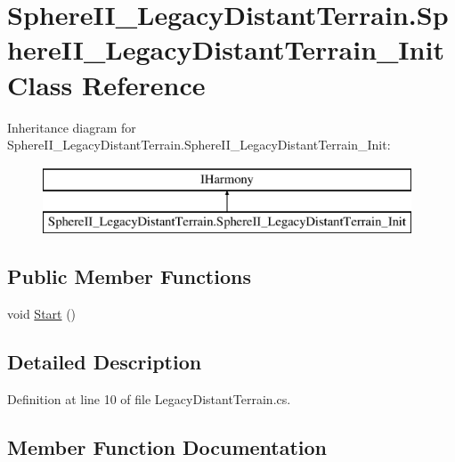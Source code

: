 \hypertarget{class_sphere_i_i___legacy_distant_terrain_1_1_sphere_i_i___legacy_distant_terrain___init}{}\section{Sphere\+I\+I\+\_\+\+Legacy\+Distant\+Terrain.\+Sphere\+I\+I\+\_\+\+Legacy\+Distant\+Terrain\+\_\+\+Init Class Reference}
\label{class_sphere_i_i___legacy_distant_terrain_1_1_sphere_i_i___legacy_distant_terrain___init}
Inheritance diagram for Sphere\+I\+I\+\_\+\+Legacy\+Distant\+Terrain.\+Sphere\+I\+I\+\_\+\+Legacy\+Distant\+Terrain\+\_\+\+Init\+:\begin{figure}[H]
\begin{center}
\leavevmode
\includegraphics[height=2.000000cm]{d5/de3/class_sphere_i_i___legacy_distant_terrain_1_1_sphere_i_i___legacy_distant_terrain___init}
\end{center}
\end{figure}
\subsection*{Public Member Functions}
\begin{DoxyCompactItemize}
\item 
void \mbox{\hyperlink{class_sphere_i_i___legacy_distant_terrain_1_1_sphere_i_i___legacy_distant_terrain___init_af49de2ff7efbeb4d5a2ad415fea193c7}{Start}} ()
\end{DoxyCompactItemize}


\subsection{Detailed Description}


Definition at line 10 of file Legacy\+Distant\+Terrain.\+cs.



\subsection{Member Function Documentation}
\mbox{\label{class_sphere_i_i___legacy_distant_terrain_1_1_sphere_i_i___legacy_distant_terrain___init_af49de2ff7efbeb4d5a2ad415fea193c7}} 
